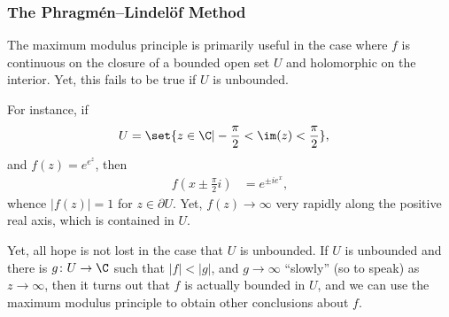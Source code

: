\documentclass[10pt]{mypackage}
\begin{document}
\subsubsection{The Phragmén--Lindelöf Method}%
The maximum modulus principle is primarily useful in the case where $f$ is continuous on the closure of a bounded open set $U$ and holomorphic on the interior. Yet, this fails to be true if $U$ is unbounded.\newline

For instance, if
\begin{align*}
  U &= \set{z\in \C | -\frac{\pi}{2} < \im(z) < \frac{\pi}{2}},
\end{align*}
and $f(z) = e^{e^{z}}$, then 
\begin{align*}
  f\left( x \pm \frac{\pi}{2}i \right) &= e^{\pm ie^{x}},
\end{align*}
whence $\left\vert f(z) \right\vert = 1$ for $z\in \partial U$. Yet, $f(z)\rightarrow \infty$ very rapidly along the positive real axis, which is contained in $U$.\newline

Yet, all hope is not lost in the case that $U$ is unbounded. If $U$ is unbounded and there is $g\colon U\rightarrow \C$  such that $\left\vert f \right\vert < \left\vert g \right\vert$, and $g\rightarrow\infty$ ``slowly'' (so to speak) as $z\rightarrow\infty$, then it turns out that $f$ is actually bounded in $U$, and we can use the maximum modulus principle to obtain other conclusions about $f$.\newline
\end{document}
